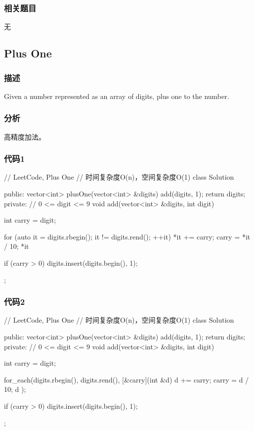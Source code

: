 \subsubsection{相关题目}
\begindot
\item 无
\myenddot


\subsection{Plus One} %
\label{sec:plus-one}


\subsubsection{描述}
Given a number represented as an array of digits, plus one to the number.


\subsubsection{分析}
高精度加法。


\subsubsection{代码1}
\begin{Code}
// LeetCode, Plus One
// 时间复杂度O(n)，空间复杂度O(1)
class Solution {
public:
    vector<int> plusOne(vector<int> &digits) {
        add(digits, 1);
        return digits;
    }
private:
    // 0 <= digit <= 9
    void add(vector<int> &digits, int digit) {
        int carry = digit;

        for (auto it = digits.rbegin(); it != digits.rend(); ++it) {
            *it += carry;
            carry = *it / 10;
            *it %
        }

        if (carry > 0) digits.insert(digits.begin(), 1);
    }
};
\end{Code}


\subsubsection{代码2}
\begin{Code}
// LeetCode, Plus One
// 时间复杂度O(n)，空间复杂度O(1)
class Solution {
public:
    vector<int> plusOne(vector<int> &digits) {
        add(digits, 1);
        return digits;
    }
private:
    // 0 <= digit <= 9
    void add(vector<int> &digits, int digit) {
        int carry = digit;

        for_each(digits.rbegin(), digits.rend(), [&carry](int &d){
            d += carry;
            carry = d / 10;
            d %
        });

        if (carry > 0) digits.insert(digits.begin(), 1);
    }
};
\end{Code}


